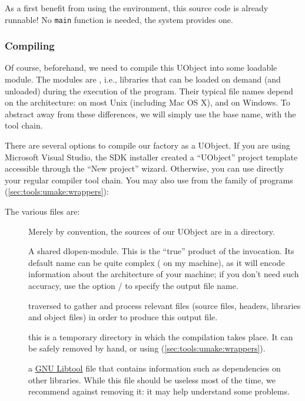 As a first benefit from using the \urbi environment, this source code
is already runnable!  No \lstinline|main| function is needed, the
\urbi system provides one.

\subsubsection{Compiling}
Of course, beforehand, we need to compile this UObject into some
loadable module.  The \urbi modules are , i.e.,
libraries that can be loaded on demand (and unloaded) during the
execution of the program.  Their typical file names depend on the
architecture:  on most Unix (including Mac OS X),
and  on Windows.
To abstract away from these differences, we will simply use the base
name,  with the \urbi tool chain.

There are several options to compile our factory as a UObject.
If you are using Microsoft Visual Studio, the \urbi SDK installer created a
``UObject'' project template accessible through the ``New project'' wizard.
Otherwise, you can use directly your regular compiler tool chain.
You may also use  from the  family of
programs
(\autoref{sec:tools:umake:wrappers}):


The various files are:
\begin{description}
\item[] Merely by convention, the sources of our
  UObject are in a  directory.
\item[] A shared dlopen-module.  This is the ``true''
  product of the  invocation.  Its default name
  can be quite complex ( on my
  machine), as it will encode information about the architecture of
  your machine; if you don't need such accuracy, use the option
  / to specify the output file name.

   traversed  to gather and
  process relevant files (source files, headers, libraries and object
  files) in order to produce this output file.

\item[] this is a temporary directory in
  which the compilation takes place.  It can be safely removed by
  hand, or using 
  (\autoref{sec:tools:umake:wrappers}).

\item[] a
  \href{http://www.gnu.org/software/libtool/}{GNU Libtool} file that
  contains information such as dependencies on other libraries.  While
  this file should be useless most of the time, we recommend against
  removing it: it may help understand some problems.
\end{description}

